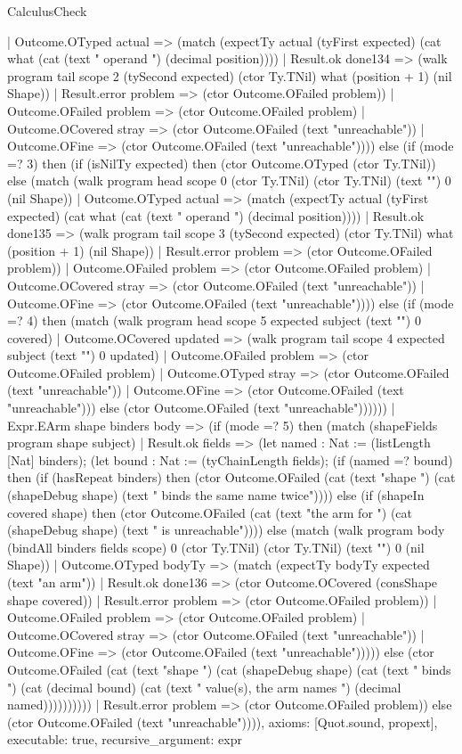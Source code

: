 \begin{lexlean}{CalculusCheck}
\begin{semanticmodule}
{      | Outcome.OTyped actual => (match (expectTy actual (tyFirst expected) (cat what (cat (text " operand ") (decimal position))))
        | Result.ok done134 => (walk program tail scope 2 (tySecond expected) (ctor Ty.TNil) what (position + 1) (nil Shape))
        | Result.error problem => (ctor Outcome.OFailed problem))
      | Outcome.OFailed problem => (ctor Outcome.OFailed problem)
      | Outcome.OCovered stray => (ctor Outcome.OFailed (text "unreachable"))
      | Outcome.OFine => (ctor Outcome.OFailed (text "unreachable")))) else (if (mode =? 3) then (if (isNilTy expected) then (ctor Outcome.OTyped (ctor Ty.TNil)) else (match (walk program head scope 0 (ctor Ty.TNil) (ctor Ty.TNil) (text "") 0 (nil Shape))
      | Outcome.OTyped actual => (match (expectTy actual (tyFirst expected) (cat what (cat (text " operand ") (decimal position))))
        | Result.ok done135 => (walk program tail scope 3 (tySecond expected) (ctor Ty.TNil) what (position + 1) (nil Shape))
        | Result.error problem => (ctor Outcome.OFailed problem))
      | Outcome.OFailed problem => (ctor Outcome.OFailed problem)
      | Outcome.OCovered stray => (ctor Outcome.OFailed (text "unreachable"))
      | Outcome.OFine => (ctor Outcome.OFailed (text "unreachable")))) else (if (mode =? 4) then (match (walk program head scope 5 expected subject (text "") 0 covered)
      | Outcome.OCovered updated => (walk program tail scope 4 expected subject (text "") 0 updated)
      | Outcome.OFailed problem => (ctor Outcome.OFailed problem)
      | Outcome.OTyped stray => (ctor Outcome.OFailed (text "unreachable"))
      | Outcome.OFine => (ctor Outcome.OFailed (text "unreachable"))) else (ctor Outcome.OFailed (text "unreachable"))))))
    | Expr.EArm shape binders body => (if (mode =? 5) then (match (shapeFields program shape subject)
      | Result.ok fields => (let named : Nat := (listLength [Nat] binders); (let bound : Nat := (tyChainLength fields); (if (named =? bound) then (if (hasRepeat binders) then (ctor Outcome.OFailed (cat (text "shape ") (cat (shapeDebug shape) (text " binds the same name twice")))) else (if (shapeIn covered shape) then (ctor Outcome.OFailed (cat (text "the arm for ") (cat (shapeDebug shape) (text " is unreachable")))) else (match (walk program body (bindAll binders fields scope) 0 (ctor Ty.TNil) (ctor Ty.TNil) (text "") 0 (nil Shape))
        | Outcome.OTyped bodyTy => (match (expectTy bodyTy expected (text "an arm"))
          | Result.ok done136 => (ctor Outcome.OCovered (consShape shape covered))
          | Result.error problem => (ctor Outcome.OFailed problem))
        | Outcome.OFailed problem => (ctor Outcome.OFailed problem)
        | Outcome.OCovered stray => (ctor Outcome.OFailed (text "unreachable"))
        | Outcome.OFine => (ctor Outcome.OFailed (text "unreachable"))))) else (ctor Outcome.OFailed (cat (text "shape ") (cat (shapeDebug shape) (cat (text " binds ") (cat (decimal bound) (cat (text " value(s), the arm names ") (decimal named))))))))))
      | Result.error problem => (ctor Outcome.OFailed problem)) else (ctor Outcome.OFailed (text "unreachable")))),
  axioms: [Quot.sound, propext],
  executable: true,
  recursive_argument: expr
}


\end{semanticmodule}
\end{lexlean}
